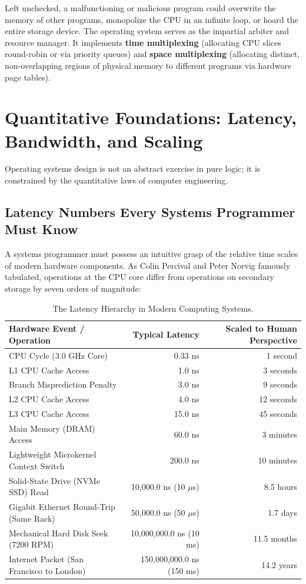 Left unchecked, a malfunctioning or malicious program could overwrite the memory of other programs, monopolize the CPU in an infinite loop, or hoard the entire storage device. The operating system serves as the impartial arbiter and resource manager. It implements \textbf{time multiplexing} (allocating CPU slices round-robin or via priority queues) and \textbf{space multiplexing} (allocating distinct, non-overlapping regions of physical memory to different programs via hardware page tables).

\section{Quantitative Foundations: Latency, Bandwidth, and Scaling}
\label{sec:quantitative_foundations}

Operating systems design is not an abstract exercise in pure logic; it is constrained by the quantitative laws of computer engineering.

\subsection{Latency Numbers Every Systems Programmer Must Know}
A systems programmer must possess an intuitive grasp of the relative time scales of modern hardware components. As Colin Percival and Peter Norvig famously tabulated, operations at the CPU core differ from operations on secondary storage by seven orders of magnitude:

\begin{table}[htbp]
\centering
\small
\begin{tabular}{lrr}
\toprule
\textbf{Hardware Event / Operation} & \textbf{Typical Latency} & \textbf{Scaled to Human Perspective} \\
\midrule
CPU Cycle (3.0 GHz Core) & 0.33 ns & 1 second \\
L1 CPU Cache Access & 1.0 ns & 3 seconds \\
Branch Misprediction Penalty & 3.0 ns & 9 seconds \\
L2 CPU Cache Access & 4.0 ns & 12 seconds \\
L3 CPU Cache Access & 15.0 ns & 45 seconds \\
Main Memory (DRAM) Access & 60.0 ns & 3 minutes \\
Lightweight Microkernel Context Switch & 200.0 ns & 10 minutes \\
Solid-State Drive (NVMe SSD) Read & 10,000.0 ns (10 $\mu$s) & 8.5 hours \\
Gigabit Ethernet Round-Trip (Same Rack) & 50,000.0 ns (50 $\mu$s) & 1.7 days \\
Mechanical Hard Disk Seek (7200 RPM) & 10,000,000.0 ns (10 ms) & 11.5 months \\
Internet Packet (San Francisco to London) & 150,000,000.0 ns (150 ms) & 14.2 years \\
\bottomrule
\end{tabular}
\caption{The Latency Hierarchy in Modern Computing Systems.}
\label{tab:latency_hierarchy}
\end{table}

